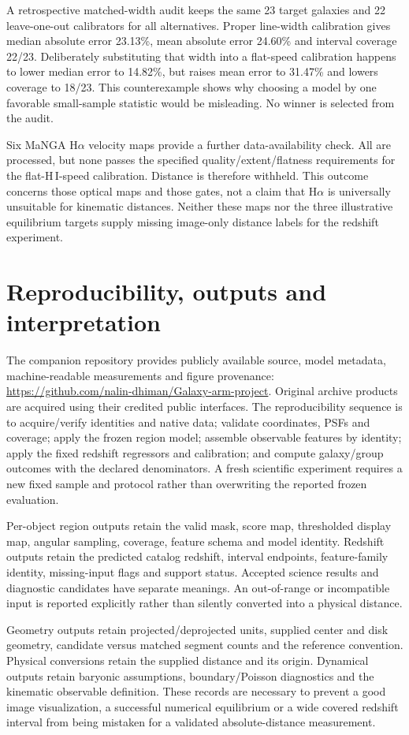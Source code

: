 \documentclass[10pt]{article}
\begin{document}
A retrospective matched-width audit keeps the same 23 target galaxies and
22 leave-one-out calibrators for all alternatives. Proper line-width
calibration gives median absolute error 23.13\%, mean absolute error 24.60\%
and interval coverage 22/23. Deliberately substituting that width into a
flat-speed calibration happens to lower median error to 14.82\%, but raises
mean error to 31.47\% and lowers coverage to 18/23. This counterexample shows
why choosing a model by one favorable small-sample statistic would be
misleading. No winner is selected from the audit.

Six MaNGA H$\alpha$ velocity maps provide a further data-availability check.
All are processed, but none passes the specified quality/extent/flatness
requirements for the flat-H\,I-speed calibration. Distance is therefore
withheld. This outcome concerns those optical maps and those gates, not a
claim that H$\alpha$ is universally unsuitable for kinematic distances.
Neither these maps nor the three illustrative equilibrium targets supply
missing image-only distance labels for the redshift experiment.

\section{Reproducibility, outputs and interpretation}
The companion repository provides publicly available source, model metadata,
machine-readable measurements and figure provenance:
\url{https://github.com/nalin-dhiman/Galaxy-arm-project}.
Original archive products are acquired using their credited public interfaces.
The reproducibility sequence is to acquire/verify identities and native data;
validate coordinates, PSFs and coverage; apply the frozen region model;
assemble observable features by identity; apply the fixed redshift regressors
and calibration; and compute galaxy/group outcomes with the declared
denominators. A fresh scientific experiment requires a new fixed sample and
protocol rather than overwriting the reported frozen evaluation.

Per-object region outputs retain the valid mask, score map, thresholded
display map, angular sampling, coverage, feature schema and model identity.
Redshift outputs retain the predicted catalog redshift, interval endpoints,
feature-family identity, missing-input flags and support status. Accepted
science results and diagnostic candidates have separate meanings. An
out-of-range or incompatible input is reported explicitly rather than
silently converted into a physical distance.

Geometry outputs retain projected/deprojected units, supplied center and disk
geometry, candidate versus matched segment counts and the reference convention.
Physical conversions retain the supplied distance and its origin. Dynamical
outputs retain baryonic assumptions, boundary/Poisson diagnostics and the
kinematic observable definition. These records are necessary to prevent a
good image visualization, a successful numerical equilibrium or a wide covered
redshift interval from being mistaken for a validated absolute-distance
measurement.

\begingroup\small


\endgroup
\end{document}
